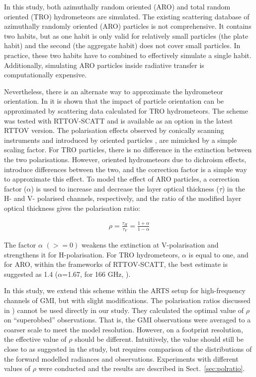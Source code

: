 \documentclass[amt, manuscript]{copernicus}
\begin{document}
In this study, both azimuthally random oriented (ARO)  and total random oriented (TRO) hydrometeors are simulated. The existing scattering database of azimuthally randomly oriented (ARO) particles \citep{brath:micro:20} is not comprehensive. It contains two habits, but as one habit is only valid for relatively small particles (the plate habit) and the second (the aggregate habit) does not cover small particles. In practice, these two habits have to combined to effectively simulate a single habit. Additionally, simulating ARO particles inside radiative transfer is computationally expensive.

Nevertheless, there is an alternate way to approximate the hydrometeor orientation. In \citet{barlakas:intro:21} it is shown that the impact of particle orientation can be approximated by scattering data calculated for TRO hydrometeors. The scheme was tested with RTTOV-SCATT \citep{saunders:rttov:18} and is available as an option in the latest RTTOV version. The polarisation effects observed by conically scanning instruments and introduced by oriented particles \citep{gong:micro:17}, are mimicked by a simple scaling factor. For TRO particles, there is no difference in the extinction between the two polarisations. However, oriented hydrometeors due to dichroism effects, introduce differences between the two, and the correction factor is a simple way to approximate this effect. To model the effect of ARO particles, a correction factor ($\alpha$) is used to increase and decrease the layer optical thickness ($\tau$) in the H- and V-
polarised channels, respectively, and the ratio of the modified layer optical thickness gives the polarisation ratio:

\begin{eqnarray}
\rho = \frac{\tau_H}{\tau_V} = \frac{1+\alpha}{1-\alpha}
\end{eqnarray}

The factor $\alpha$ $(>= 0)$  weakens the extinction at V-polarisation and strengthens it for H-polarisation. For TRO hydrometeors, $\alpha$ is equal to one, and for ARO, within the frameworks of RTTOV-SCATT, the best estimate is suggested as 1.4 ($\alpha$=1.67, for 166\,\,GHz, \citep{barlakas:intro:21}).

In this study, we extend this scheme within the ARTS setup for high-frequency channels of GMI, but with slight modifications. The polarisation ratios discussed in \citep{barlakas:intro:21}) cannot be used directly in our study. They calculated the optimal value of $\rho$ on ``superobbed'' observations. That is, the GMI observations were averaged to a coarser scale to meet the model resolution. However, on a footprint resolution, the effective value of $\rho$ should be different.  Intuitively, the value should still be close to as suggested in the study, but requires comparison of the distributions of the forward modelled radiances and observations. Experiments with different values of $\rho$ were conducted and the results are described in Sect.~\ref{sec:polratio}.
\end{document}
